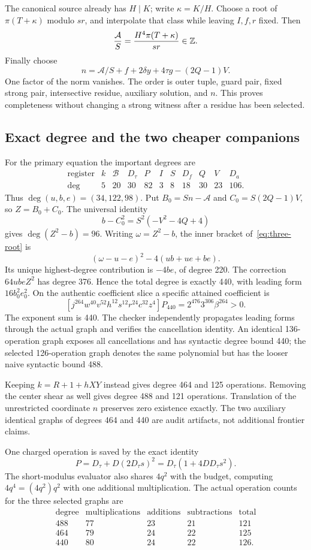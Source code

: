 The canonical source already has $H\mid K$; write $\kappa=K/H$.
Choose a root of $\pi(T+\kappa)$ modulo $sr$, and interpolate that
class while leaving $I,f,r$ fixed. Then
\[
 \frac{\mathcal A}{S}
   =\frac{H^4\pi(T+\kappa)}{sr}\in\mathbb Z.
\]
Finally choose
\[
 n=\mathcal A/S+f+2\delta y+4\tau g-(2Q-1)V.
\]
One factor of the norm vanishes. The order is outer tuple, guard pair,
fixed strong pair, intersective residue, auxiliary solution, and $n$.
This proves completeness without changing a strong witness after a
residue has been selected.

\subsection{Exact degree and the two cheaper companions}
For the primary equation the important degrees are
\[
\begin{array}{c|rrrrrrrrrr}
\text{register}&k&\mathcal B&D_\tau&P&I&S&D_f&Q&V&D_a\\\hline
\deg&5&20&30&82&3&8&18&30&23&106.
\end{array}
\]
Thus $\deg(u,b,e)=(34,122,98)$. Put
$B_0=Sn-\mathcal A$ and $C_0=S(2Q-1)V$, so $Z=B_0+C_0$.
The universal identity
\[
 b-C_0^2=S^2(-V^2-4Q+4)
\]
gives $\deg(Z^2-b)=96$. Writing $\omega=Z^2-b$, the inner bracket
of~\eqref{eq:three-root} is
\[
 (\omega-u-e)^2-4(ub+ue+be).
\]
Its unique highest-degree contribution is $-4be$, of degree 220.
The correction $64ubeZ^2$ has degree 376. Hence the total degree is
exactly 440, with leading form $16b_0^2e_0^2$. On the authentic
coefficient slice a specific attained coefficient is
\[
 [j^{264}w^{40}v^{52}h^{12}s^{12}r^{24}c^{32}z^4]P_{440}
   =2^{476}3^{306}\beta^{264}>0.
\]
The exponent sum is 440. The checker independently propagates leading
forms through the actual graph and verifies the cancellation identity.
An identical 136-operation graph exposes all cancellations and has
syntactic degree bound 440; the selected 126-operation graph denotes the
same polynomial but has the looser naive syntactic bound 488.

Keeping $k=R+1+hXY$ instead gives degree 464 and 125 operations. Removing
the center shear as well gives degree 488 and 121 operations. Translation
of the unrestricted coordinate $n$ preserves zero existence exactly.
The two auxiliary identical graphs of degrees 464 and 440 are audit
artifacts, not additional frontier claims.

One charged operation is saved by the exact identity
\[
 P=D_\tau+D(2D_\tau s)^2
   =D_\tau(1+4D D_\tau s^2).
\]
The short-modulus evaluator also shares $4q^2$ with the budget, computing
$4q^4=(4q^2)q^2$ with one additional multiplication.
The actual operation counts for the three selected graphs are
\[
\begin{array}{c|rrr|r}
\text{degree}&\text{multiplications}&\text{additions}&\text{subtractions}&\text{total}\\\hline
488&77&23&21&121\\
464&79&24&22&125\\
440&80&24&22&126.
\end{array}
\]
